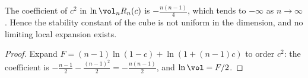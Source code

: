 \begin{theorem}\label{thm:main}
The coefficient of $c^2$ in $\ln\vol_nR_n(c)$ is $-\tfrac{n(n-1)}{4}$, which tends to $-\infty$ as $n\to\infty$. Hence the stability constant of the cube is not uniform in the dimension, and no limiting local expansion exists.
\end{theorem}
\begin{proof}
Expand $F=(n-1)\ln(1-c)+\ln(1+(n-1)c)$ to order $c^2$: the coefficient is $-\frac{n-1}{2}-\frac{(n-1)^2}{2}=-\frac{n(n-1)}{2}$, and $\ln\vol=F/2$.
\end{proof}
